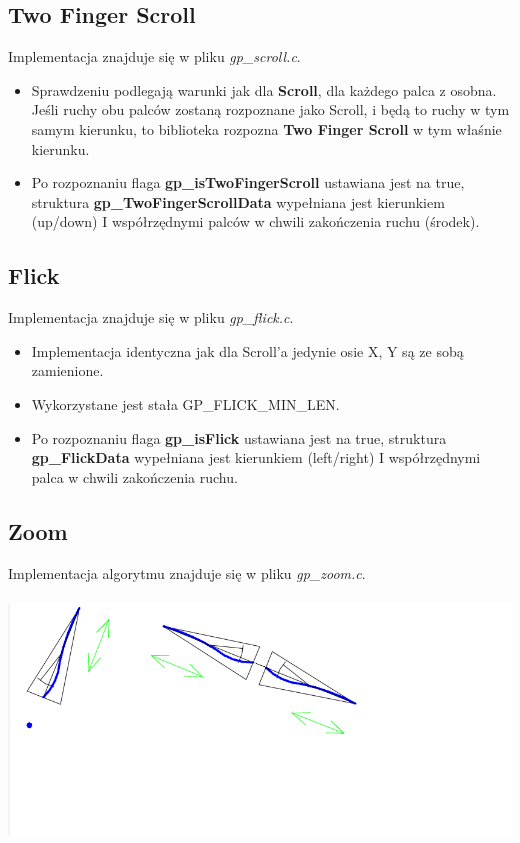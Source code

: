 \documentclass[a4paper,12pt]{article}
\begin{document}
	\subsection{Two Finger Scroll}
	Implementacja znajduje się w pliku \textit{gp_scroll.c}.
	\begin{itemize}
		\item Sprawdzeniu podlegają warunki jak dla \textbf{Scroll}, dla każdego palca z osobna. Jeśli ruchy obu palców zostaną rozpoznane jako Scroll, i będą to ruchy w tym samym kierunku, to biblioteka rozpozna \textbf{Two Finger Scroll} w tym właśnie kierunku.
		\item Po rozpoznaniu flaga \textbf{gp_isTwoFingerScroll} ustawiana jest na true, struktura \textbf{gp_TwoFingerScrollData} wypełniana jest kierunkiem (up/down) I współrzędnymi palców w chwili zakończenia ruchu (środek).
	\end{itemize}
	 
		
	\subsection{Flick}
	Implementacja znajduje się w pliku \textit{gp_flick.c}. 
	\begin{itemize}
		\item Implementacja identyczna jak dla Scroll'a jedynie osie X, Y są ze sobą zamienione. 
		\item Wykorzystane jest stała GP_FLICK_MIN_LEN.
		\item Po rozpoznaniu flaga \textbf{gp_isFlick} ustawiana jest na true, struktura \textbf{gp_FlickData} wypełniana jest kierunkiem (left/right) I współrzędnymi palca w chwili zakończenia ruchu.
	\end{itemize}
		
	\subsection{Zoom}
	Implementacja algorytmu znajduje się w pliku \textit{gp_zoom.c}. \\ \\
	\includegraphics[width=1.0\textwidth]{../data/ImplZoom}
	
\end{document}
